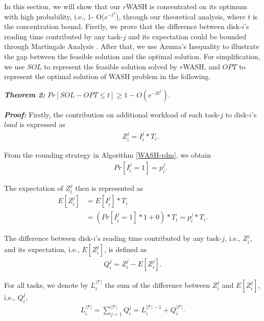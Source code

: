 \documentclass[conference]{IEEEtran}
\begin{document}
In this section, we will show that our $r$WASH is concentrated on its optimum with high probability, i.e., 1- O($e^{-t^2}$), through our theoretical analysis, where $t$ is the concentration bound. Firstly, we prove that the difference between disk-$i$'s reading time contributed by any task-$j$ and its expectation could be bounded through Martingale Analysis \cite{b12}. After that, we use Azuma's Inequality to illustrate the gap between the feasible solution and the optimal solution. For simplification, we use $SOL$ to represent the feasible solution solved by $r$WASH, and $OPT$ to represent the optimal solution of WASH problem in the following.

\vspace{0.2cm}
\emph{\textbf{Theorem 2:}} $Pr[SOL - OPT\leq t] \geq 1 - O(e^{-2t^2})$.

\emph{\textbf{Proof:}} Firstly, the contribution on additional workload of each task-$j$ to disk-$i$'s $load$ is expressed as
\vspace{-0.1cm}
 \begin{align}
&\;\;\;\;\;Z_i^j = I_i^j*T_i.
\end{align}

\vspace{-0.2cm}
From the rounding strategy in Algorithm \ref{WASH-rdm}, we obtain
 \vspace{-0.2cm}
 \begin{align}
&\;\;\;\;\;Pr[I_i^j = 1] = p_i^j. \nonumber
\end{align}

\vspace{-0.2cm}
The expectation of $Z_i^j$ then is represented as
\vspace{-0.2cm}
\begin{align}
E[Z_i^j] &= E[I_i^j]*T_i \nonumber\\
&= (Pr[I_i^j = 1] * 1 +  0)*T_i = p_i^j*T_i.\label{prove:expect}
\end{align}

\vspace{-0.2cm}
The difference between disk-$i$'s reading time contributed by any task-$j$, i.e., $Z_i^j$, and its expectation, i.e., $E[Z_i^j]$, is defined as
 \vspace{-0.1cm}
\begin{align}
Q_i^j = Z_i^j - E[Z_i^j].\label{prove:diff}
\end{align}

\vspace{-0.2cm}
For all tasks, we denote by $L_i^{\mathcal{|T|}}$ the sum of the difference between $Z_i^j$ and $E[Z_i^j]$, i.e., $Q_i^j$, 
 \vspace{-0.1cm}
\begin{align}
L_i^{\mathcal{|T|}} = \sum\nolimits_{j = 1}^{\mathcal{|T|}} Q_i^j
=  L_i^{\mathcal{|T|} - 1} + Q_i^{\mathcal{|T|}}. \label{prove:L_margin}
\end{align}
\end{document}
